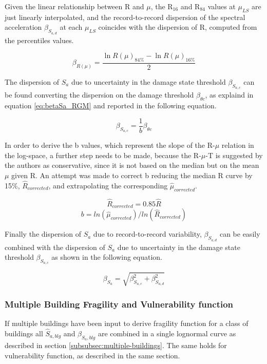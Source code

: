 Given the linear relationship between R and $\mu$, the R$_{16}$ and R$_84$ values at $\mu_{LS}$ are just linearly interpolated, and the record-to-record dispersion of the spectral acceleration $\beta_{S_{a, d}}$ at each $\mu_{LS}$ coincides with the dispersion of R, computed from the percentiles values.

\begin{equation}
\label{eq:beta_DF}
\beta_{R(\mu)} = \frac{\ln R(\mu)_{84\%} - \ln R(\mu)_{16\%}}{2}
\end{equation} 

The dispersion of $S_{a}$ due to uncertainty in the damage state threshold $\beta_{S_{a, c}}$ can be found converting the dispersion on the damage threshold $\beta_{\theta c}$, as explaind in equation \ref{eq:betaSa_RGM} and reported in the following equation.

\begin{equation}
\label{eq:betasc_DF}
\beta_{S_{a, c}} = \frac{1}{b} \beta_{\theta c}
\end{equation}

In order to derive the b values, which represent the slope of the R-$\mu$ relation in the log-space, a further step needs to be made, because the R-$\mu$-T is suggested by the authors as conservative, since it is not based on the median but on the mean $\mu$ given R. An attempt was made to correct b reducing the median R curve by 15\%, $\hat{R}_{corrected}$, and extrapolating the corresponding $\hat{\mu}_{corrected}$.

\begin{equation}
\hat{R}_{corrected}=0.85\hat{R}
\end{equation}
\begin{equation}
\label{eq:bcorrected_DF}
b=ln(\hat{\mu}_{corrected})/ln(\hat{R}_{corrected})
\end{equation}

Finally the dispersion of $S_{a}$ due to record-to-record variability, $\beta_{S_{a, d}}$ can be easily combined with the dispersion of $S_{a}$ due to uncertainty in the damage state threshold $\beta_{S_{a, c}}$ as shown in the following equation.

\begin{equation}
\label{eq:betatotal_DF}
\beta_{S_a} = \sqrt{\beta_{S_{a, c}}^2 + \beta_{S_{a, d}}^2}
\end{equation}

\subsubsection{Multiple Building Fragility and Vulnerability function}
\label{subsubsec:multiple-building-DF}
 If multiple buildings have been input to derive fragility function for a class of buildings all $\hat{S}_{a, blg}$ and $\beta_{S_a, blg}$ are combined in a single lognormal curve as described in section \ref{subsubsec:multiple-buildings}. The same holds for vulnerability function, as described in the same section.

